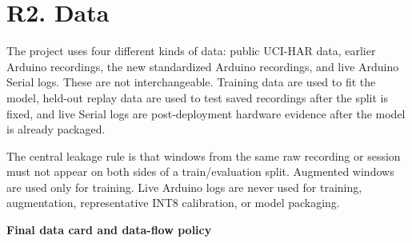 \documentclass[11pt,a4paper]{article}
\begin{document}
\section{R2. Data}

The project uses four different kinds of data: public UCI-HAR data, earlier Arduino recordings, the new standardized Arduino recordings, and live Arduino Serial logs. These are not interchangeable. Training data are used to fit the model, held-out replay data are used to test saved recordings after the split is fixed, and live Serial logs are post-deployment hardware evidence after the model is already packaged.

The central leakage rule is that windows from the same raw recording or session must not appear on both sides of a train/evaluation split. Augmented windows are used only for training. Live Arduino logs are never used for training, augmentation, representative INT8 calibration, or model packaging.

\textbf{Final data card and data-flow policy}
\end{document}
